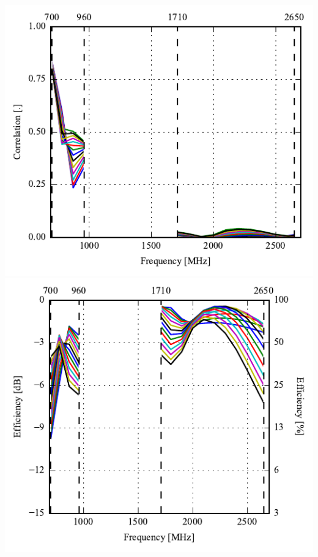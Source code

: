 \begin{frame}
\begin{minipage}[t]{0.49\linewidth}
    \includegraphics[width=0.78\linewidth]{img/henrik/triag/correlation_Csh2-sweep} \\
    \includegraphics[width=0.78\linewidth]{img/henrik/triag/efficiency-ac2-csh2.pdf} 


  \end{minipage}    

\end{frame}


